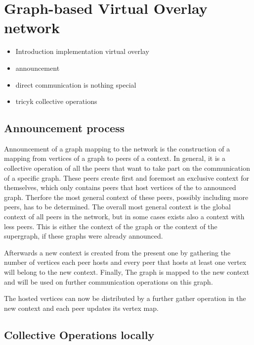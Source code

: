 
\section{Graph-based Virtual Overlay network}
\label{sec:overlay}

\begin{itemize}
\item Introduction implementation virtual overlay
\item announcement
\item direct communication is nothing special
\item tricyk collective operations
\end{itemize}

\subsection{Announcement process}

Announcement of a graph mapping to the network is the construction of
a mapping from vertices of a graph to peers of a context. In general,
it is a collective operation of all the peers that want to take part
on the communication of a specific graph.  These peers create first
and foremost an exclusive context for themselves, which only contains
peers that host vertices of the to announced graph.  Therfore the most
general context of these peers, possibly including more peers, has to
be determined.  The overall most general context is the global context
of all peers in the network, but in some cases exists also a context
with less peers.  This is either the context of the graph or the
context of the supergraph, if these graphs were already announced.

Afterwards a new context is created from the present one by gathering
the number of vertices each peer hosts and every peer that hosts at
least one vertex will belong to the new context.  Finally, The graph
is mapped to the new context and will be used on further communication
operations on this graph.

The hosted vertices can now be distributed by a further gather
operation in the new context and each peer updates its vertex map.


\subsection{Collective Operations locally}

